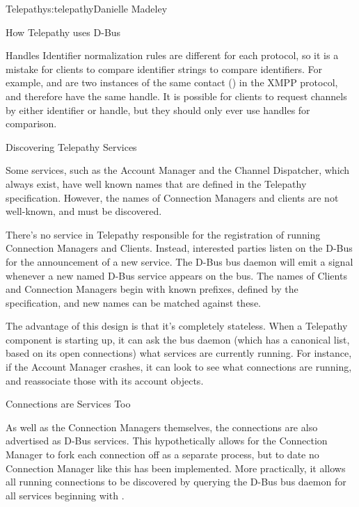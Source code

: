 \begin{aosachapter}{Telepathy}{s:telepathy}{Danielle Madeley}
\begin{aosasect1}{How Telepathy uses D-Bus}
\begin{aosasect2}{Handles}
Identifier normalization rules are different for each protocol, so it
is a mistake for clients to compare identifier strings to compare
identifiers. For example,  and
 are two instances of the same
contact () in the XMPP protocol, and therefore
have the same handle. It is possible for clients to request channels
by either identifier or handle, but they should only ever use handles
for comparison.

\end{aosasect2}

\begin{aosasect2}{Discovering Telepathy Services}

Some services, such as the Account Manager and the Channel Dispatcher,
which always exist, have well known names that are defined in the
Telepathy specification. However, the names of Connection Managers and
clients are not well-known, and must be discovered.

There's no service in Telepathy responsible for the registration of
running Connection Managers and Clients. Instead, interested parties
listen on the D-Bus for the announcement of a new service.  The D-Bus
bus daemon will emit a signal whenever a new named D-Bus service
appears on the bus. The names of Clients and Connection Managers begin
with known prefixes, defined by the specification, and new names can
be matched against these.

The advantage of this design is that it's completely stateless. When a
Telepathy component is starting up, it can ask the bus daemon (which
has a canonical list, based on its open connections) what services are
currently running.  For instance, if the Account Manager crashes, it
can look to see what connections are running, and reassociate those
with its account objects.

\begin{aosabox}{Connections are Services Too}

As well as the Connection Managers themselves, the connections are
also advertised as D-Bus services. This hypothetically allows for the
Connection Manager to fork each connection off as a separate process,
but to date no Connection Manager like this has been implemented.
More practically, it allows all running connections to be discovered
by querying the D-Bus bus daemon for all services beginning with
.

\end{aosabox}


\end{aosasect2}
\end{aosasect1}
\end{aosachapter}
